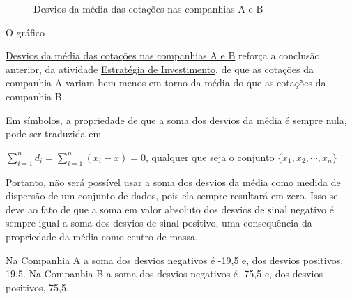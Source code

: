{\begin{figure}[H]
\begin{minipage}{0.45\textwidth}
\end{minipage}
\caption{Desvios da média das cotações nas companhias A e B}\label{\detokenize{PE104-4:fig-desvios-da-media}}\label{\detokenize{PE104-4:id3}}\end{figure}

O gráfico {\hyperref[\detokenize{PE104-4:fig-desvios-da-media}]{Desvios da média das cotações nas companhias A e B} reforça a conclusão anterior, da atividade \hyperref[\detokenize{PE104-3:ativ-estrategia-de-investimento}]{Estratégia de Investimento}, de que as cotações da companhia A variam bem menos em torno da média do que as cotações da companhia B.

Em símbolos, a propriedade de que a soma dos desvios da média é sempre nula, pode ser traduzida em

\(\displaystyle{\sum^n_{i=1}} d_i=\displaystyle{\sum^n_{i=1}} (x_i-\bar{x})=0\), qualquer que seja o conjunto \(\{ x_1,x_2,\cdots, x_n\}\)

Portanto, não será possível usar a soma dos desvios da média como medida de dispersão de um conjunto de dados, pois ela sempre resultará em zero. Isso se deve ao fato de que a soma em valor absoluto dos desvios de sinal negativo é sempre igual a soma dos desvios de sinal positivo, uma consequência da propriedade da média como centro de massa.

Na Companhia A a soma dos desvios negativos é -19,5 e, dos desvios positivos, 19,5. Na Companhia B a soma dos desvios negativos é -75,5 e, dos desvios positivos, 75,5.

}}
